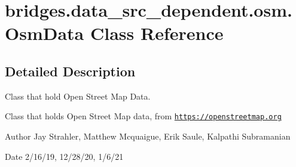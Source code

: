 \hypertarget{classbridges_1_1data__src__dependent_1_1osm_1_1_osm_data}{}\section{bridges.\+data\+\_\+src\+\_\+dependent.\+osm.\+Osm\+Data Class Reference}
\label{classbridges_1_1data__src__dependent_1_1osm_1_1_osm_data}


\subsection{Detailed Description}
Class that hold Open Street Map Data. 

Class that holds Open Street Map data, from \href{https://openstreetmap.org}{\tt https\+://openstreetmap.\+org}

\begin{DoxyAuthor}{Author}
Jay Strahler, Matthew Mcquaigue, Erik Saule, Kalpathi Subramanian 
\end{DoxyAuthor}
\begin{DoxyDate}{Date}
2/16/19, 12/28/20, 1/6/21 
\end{DoxyDate}
